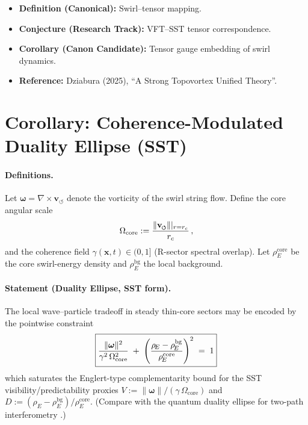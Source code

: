 \documentclass[10pt,reprint,aps,onecolumn,nofootinbib]{revtex4-2}
\newcommand{\vswirl}{\mathbf{v}_{\!\boldsymbol{\circlearrowleft}}}
\newcommand{\vnorm}{\lVert \mathbf{v}_{\mkern-2mu\scriptscriptstyle\boldsymbol{\circlearrowleft}} \rVert}               %
\newcommand{\rhoE}{\rho_{\!E}}                           %
\newcommand{\rc}{r_c}                                    %
\providecommand{\rc}{r_c}
\newcommand{\omegaVec}{\boldsymbol{\omega}}
\newcommand{\OmegaCore}{\Omega_{\mathrm{core}}}
\newcommand{\bg}{\mathrm{bg}}
\newcommand{\core}{\mathrm{core}}
\begin{document}
        \begin{itemize}
        \item \textbf{Definition (Canonical):} Swirl–tensor mapping.
        \item \textbf{Conjecture (Research Track):} VFT–SST tensor correspondence.
        \item \textbf{Corollary (Canon Candidate):} Tensor gauge embedding of swirl dynamics.
        \item \textbf{Reference:} Dziabura (2025), “A Strong Topovortex Unified Theory”.
        \end{itemize}



    \section{Corollary: Coherence-Modulated Duality Ellipse (SST)}
    \label{sec:duality-ellipse-sst}

    \paragraph{Definitions.}
        Let $\omegaVec=\nabla\times\vswirl$ denote the vorticity of the swirl string flow.
        Define the core angular scale
        \begin{equation}
        \OmegaCore := \frac{\vnorm|_{r=\rc}}{\rc}\,,
        \end{equation}
        and the coherence field $\gamma(\mathbf x,t)\in(0,1]$ (R-sector spectral overlap).
        Let $\rhoE^{\core}$ be the core swirl-energy density and $\rhoE^{\bg}$ the local background.

    \paragraph{Statement (Duality Ellipse, SST form).}
        The local wave–particle tradeoff in steady thin-core sectors may be encoded by the pointwise constraint
        \begin{equation}
        \boxed{%
            \frac{\lVert\omegaVec\rVert^{2}}{\gamma^{2}\,\OmegaCore^{2}}
            \;+\;
            \left(\frac{\rhoE-\rhoE^{\bg}}{\rhoE^{\core}}\right)^{2}
            \;=\;1
        }
        \label{eq:SST-DualityEllipse}
        \end{equation}
        which saturates the Englert-type complementarity bound for the SST visibility/predictability proxies
        $V:=\lVert\omegaVec\rVert/(\gamma\,\OmegaCore)$ and $D:=(\rhoE-\rhoE^{\bg})/\rhoE^{\core}$.
        (Compare with the quantum duality ellipse for two-path interferometry \cite{Englert1996,KhatiwadaQian2025}.)
\end{document}
